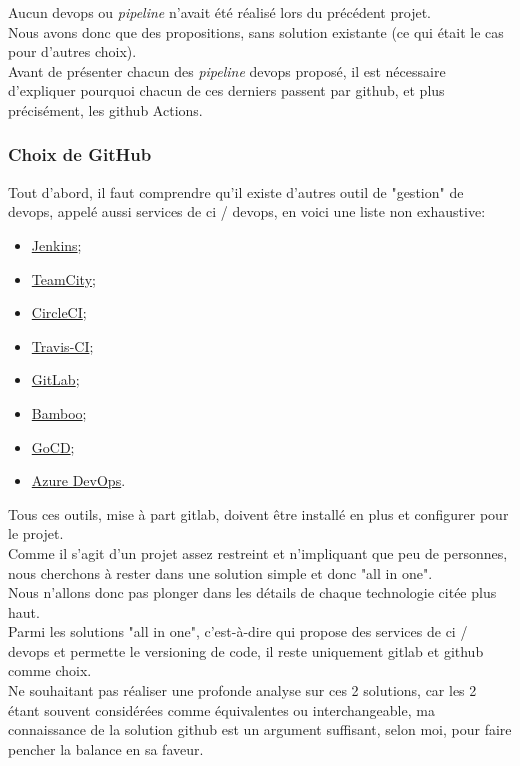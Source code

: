 \documentclass[
    iai, %
    il, %
]{heig-tb}
\begin{document}
Aucun \Gls{devops} ou \emph{pipeline} n'avait été réalisé lors du précédent projet.\\
Nous avons donc que des propositions, sans solution existante (ce qui était le cas pour d'autres choix).\\

Avant de présenter chacun des \emph{pipeline} \Gls{devops} proposé, il est nécessaire d'expliquer pourquoi chacun de ces derniers passent par \Gls{github}, et plus précisément, les \Gls{github} Actions.

\subsubsection{Choix de GitHub}
Tout d'abord, il faut comprendre qu'il existe d'autres outil de "gestion" de \Gls{devops}, appelé
aussi services de \Gls{ci} / \Gls{devops}, en voici une liste non exhaustive:
\begin{multicols}{2}
    \begin{itemize}
        \item \href{https://www.jenkins.io/}{Jenkins};
        \item \href{https://www.jetbrains.com/teamcity/}{TeamCity};
        \item \href{https://www.guru99.com/top-20-continuous-integration-tools.html}{CircleCI};
        \item \href{https://www.travis-ci.com/}{Travis-CI};
        \item \href{https://about.gitlab.com/}{GitLab};
        \item \href{https://www.atlassian.com/software/bamboo}{Bamboo};
        \item \href{https://www.gocd.org/}{GoCD};
        \item \href{https://azure.microsoft.com/fr-fr/services/devops/}{Azure DevOps}.
    \end{itemize}
\end{multicols}

Tous ces outils, mise à part \Gls{gitlab}, doivent être installé en plus et configurer pour le projet.\\
Comme il s'agit d'un projet assez restreint et n'impliquant que peu de personnes, nous cherchons à rester dans une solution simple et donc "all in one".\\
Nous n'allons donc pas plonger dans les détails de chaque technologie citée plus haut.\\
Parmi les solutions "all in one", c'est-à-dire qui propose des services de \Gls{ci} / \Gls{devops} et permette le versioning de code, il reste uniquement \Gls{gitlab} et \Gls{github} comme choix.\\
Ne souhaitant pas réaliser une profonde analyse sur ces 2 solutions, car les 2 étant souvent considérées comme équivalentes ou interchangeable, ma connaissance de la solution \Gls{github} est un argument suffisant, selon moi, pour faire pencher la balance en sa faveur.
\end{document}
